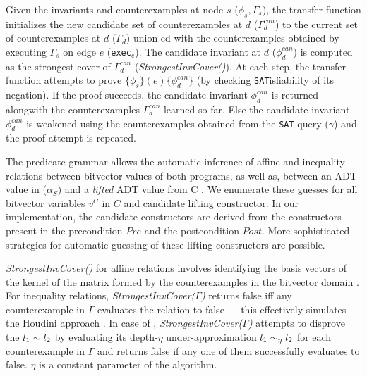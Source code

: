 Given the invariants and counterexamples at node $s$
($\phi_s,\Gamma_s$),
the transfer function initializes the new candidate set
of counterexamples at $d$ ($\Gamma^{can}_{d}$)
to the current set of counterexamples at $d$ ($\Gamma_{d}$) union-ed with
the counterexamples obtained by executing $\Gamma_s$ on edge $e$ ({\tt exec$_e$}).
The candidate invariant at $d$ ($\phi^{can}_d$) is computed
as the strongest cover of $\Gamma^{can}_{d}$ ({\em StrongestInvCover()}).
At each step, the transfer function attempts to prove
$\{\phi_s\} (e) \{\phi^{can}_d\}$ (by checking {\tt SAT}isfiability of its
negation). If the proof succeeds, the candidate invariant $\phi^{can}_d$ is
returned alongwith the counterexamples $\Gamma^{can}_d$ learned so far.
Else the candidate invariant $\phi^{can}_d$ is weakened using
the counterexamples obtained from the {\tt SAT} query ($\gamma$) and the proof attempt is
repeated.

The predicate grammar allows the automatic inference of
affine and inequality relations between bitvector values of both
programs, as well as, \recursiveRelations{} between an ADT value in \SpecL{} ($\alpha_S$)
and a {\em lifted} ADT value from C .
We enumerate these \recursiveRelation{}
guesses for all bitvector variables $v^{C}$ in $C$ and candidate  lifting constructor.
In our implementation, the candidate 
constructors are derived from the constructors
present in the precondition $Pre$
and the postcondition $Post$.  More
sophisticated strategies for automatic guessing of
these lifting constructors
are possible.

{\em StrongestInvCover()} for affine relations involves
identifying the basis vectors of the kernel of the
matrix formed by the counterexamples in the bitvector
domain \cite{esop05,semalign}.
For inequality relations, {\em StrongestInvCover($\Gamma$)}
returns false iff any counterexample in $\Gamma$ evaluates the
relation to false --- this effectively simulates the Houdini approach \cite{houdini}.
In case of \recursiveRelations{}, {\em StrongestInvCover($\Gamma$)}
attempts to disprove the \recursiveRelation{} $l_1 \sim{} l_2$ by evaluating
its depth-$\eta$ under-approximation $l_1 \sim_\eta l_2$ for each counterexample
in $\Gamma$ and returns false if any one of them successfully evaluates to false.
$\eta$ is a constant parameter of the algorithm.

